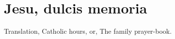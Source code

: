 \documentclass[oldfontcommands,a5paper,openany]{memoir}
\begin{document}
\autocompilegabc

\section{Jesu, dulcis memoria}


Translation, Catholic hours, or, The family prayer-book.
\end{document}
